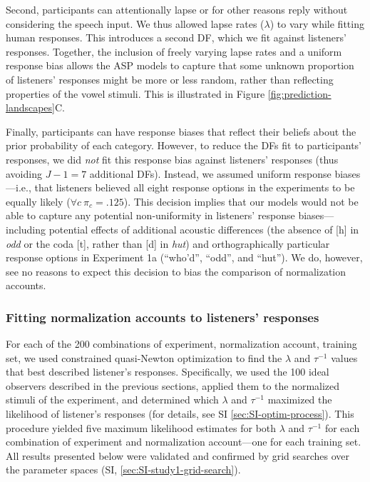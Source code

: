 \documentclass[preprint]{JASA}
\begin{document}
Second, participants can attentionally lapse or for other reasons reply without considering the speech input. We thus allowed lapse rates (\(\lambda\)) to vary while fitting human responses. This introduces a second DF, which we fit against listeners' responses. Together, the inclusion of freely varying lapse rates and a uniform response bias allows the ASP models to capture that some unknown proportion of listeners' responses might be more or less random, rather than reflecting properties of the vowel stimuli. This is illustrated in Figure \ref{fig:prediction-landscapes}C.

Finally, participants can have response biases that reflect their beliefs about the prior probability of each category. However, to reduce the DFs fit to participants' responses, we did \emph{not} fit this response bias against listeners' responses (thus avoiding \(J - 1 = 7\) additional DFs). Instead, we assumed uniform response biases---i.e., that listeners believed all eight response options in the experiments to be equally likely (\(\forall c\ \pi_c = .125\)). This decision implies that our models would not be able to capture any potential non-uniformity in listeners' response biases---including potential effects of additional acoustic differences (the absence of {[}h{]} in \emph{odd} or the coda {[}t{]}, rather than {[}d{]} in \emph{hut}) and orthographically particular response options in Experiment 1a (``who'd'', ``odd'', and ``hut''). We do, however, see no reasons to expect this decision to bias the comparison of normalization accounts.

\subsubsection{Fitting normalization accounts to listeners' responses}\label{sec:fitting-accounts}

For each of the 200 combinations of experiment, normalization account, training set, we used constrained quasi-Newton optimization \citep[as implemented in \texttt{R}'s \texttt{optim()} function]{byrd1995} to find the \(\lambda\) and \(\tau^{-1}\) values that best described listener's responses. Specifically, we used the 100 ideal observers described in the previous sections, applied them to the normalized stimuli of the experiment, and determined which \(\lambda\) and \(\tau^{-1}\) maximized the likelihood of listener's responses (for details, see SI \ref{sec:SI-optim-process}). This procedure yielded five maximum likelihood estimates for both \(\lambda\) and \(\tau^{-1}\) for each combination of experiment and normalization account---one for each training set. All results presented below were validated and confirmed by grid searches over the parameter spaces (SI, \ref{sec:SI-study1-grid-search}).
\end{document}
